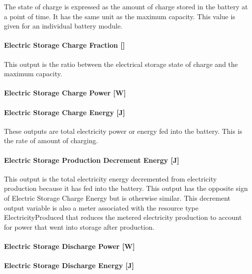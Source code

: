 The state of charge is expressed as the amount of charge stored in the battery at a point of time. It has the same unit as the maximum capacity. This value is given for an individual battery module.

\paragraph{Electric Storage Charge Fraction {[]}}\label{electric-storage-charge-fraction}

This output is the ratio between the electrical storage state of charge and the maximum capacity.

\paragraph{Electric Storage Charge Power {[}W{]}}\label{electric-storage-charge-power-w-1}

\paragraph{Electric Storage Charge Energy {[}J{]}}\label{electric-storage-charge-energy-j-1}

These outputs are total electricity power or energy fed into the battery. This is the rate of amount of charging.

\paragraph{Electric Storage Production Decrement Energy {[}J{]}}\label{electric-storage-production-decrement-energy-j-1}

This output is the total electricity energy decremented from electricity production because it has fed into the battery. This output has the opposite sign of Electric Storage Charge Energy but is otherwise similar. This decrement output variable is also a meter associated with the resource type ElectricityProduced that reduces the metered electricity production to account for power that went into storage after production.

\paragraph{Electric Storage Discharge Power {[}W{]}}\label{electric-storage-discharge-power-w-1}

\paragraph{Electric Storage Discharge Energy {[}J{]}}\label{electric-storage-discharge-energy-j-1}

